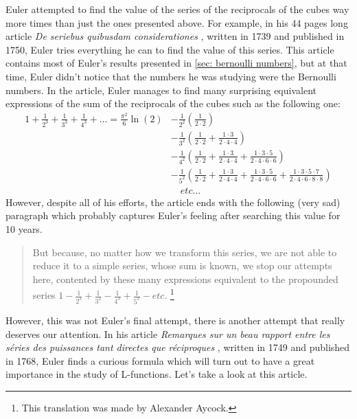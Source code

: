Euler attempted to find the value of the series of the reciprocals of the cubes way more times than just the ones presented above. For example, in his 44 pages long article \textit{De seriebus quibusdam considerationes} \cite{eulerE130}, written in 1739 and published in 1750, Euler tries everything he can to find the value of this series. This article contains most of Euler's results presented in \autoref{sec: bernoulli numbers}, but at that time, Euler didn't notice that the numbers he was studying were the Bernoulli numbers. In the article, Euler manages to find many surprising equivalent expressions of the sum of the reciprocals of the cubes such as the following one:
\begin{align*}
    1 + \frac{1}{2^3} + \frac{1}{3^3} + \frac{1}{4^3} + \dots = \frac{\pi^2}{6}\ln(2) & - \frac{1}{2^2}\left(\frac{1}{2\cdot 2}\right) \\
    &-\frac{1}{3^2}\left(\frac{1}{2\cdot 2} + \frac{1 \cdot 3}{2 \cdot 4 \cdot 4}\right) \\ 
    &-\frac{1}{4^2}\left(\frac{1}{2\cdot 2} + \frac{1 \cdot 3}{2 \cdot 4 \cdot 4} + \frac{1 \cdot 3 \cdot 5}{2 \cdot 4 \cdot 6 \cdot 6}\right) \\ 
    &-\frac{1}{5^2}\left(\frac{1}{2\cdot 2} + \frac{1 \cdot 3}{2 \cdot 4 \cdot 4} + \frac{1 \cdot 3 \cdot 5}{2 \cdot 4 \cdot 6 \cdot 6} + \frac{1 \cdot 3 \cdot 5 \cdot 7}{2 \cdot 4 \cdot 6 \cdot 8 \cdot 8}\right) \\
    & \quad etc...
\end{align*}
However, despite all of his efforts, the article ends with the following (very sad) paragraph which probably captures Euler's feeling after searching this value for 10 years.

\begin{quote}
    But because, no matter how we transform this series, we are not able to reduce it to a simple series, whose sum is known, we stop our attempts here, contented by these many expressions equivalent to the propounded series $1 - \frac{1}{2^3} + \frac{1}{3^2} - \frac{1}{4^3} + \frac{1}{5^2} - etc.$ \footnote{This translation was made by Alexander Aycock.}
\end{quote}
However, this was not Euler's final attempt, there is another attempt that really deserves our attention. In his article \textit{Remarques sur un beau rapport entre les séries des puissances tant directes que réciproques} \cite{eulerE353}, written in 1749 and published in 1768, Euler finds a curious formula which will turn out to have a great importance in the study of L-functions. Let's take a look at this article.

